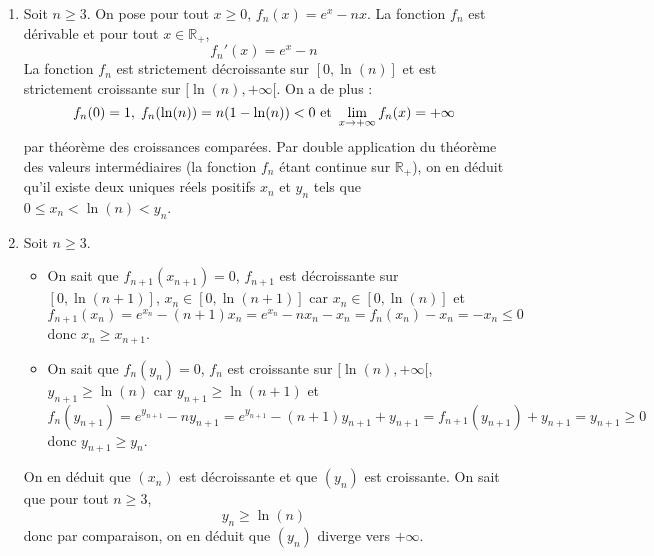 \documentclass[a4paper,10pt]{report}
\begin{document}
\corr \begin{enumerate}
\item Soit $n \geq 3$. On pose pour tout $x \geq 0$, $f_n(x)=e^x-nx$. La fonction $f_n$ est dérivable et pour tout $x \in \mathbb{R}_+$,
$$ f_n'(x)=e^x-n$$
La fonction $f_n$ est strictement décroissante sur $[0, \ln(n)]$ et est strictement croissante sur $[\ln(n), + \infty[$. On a de plus :
$$ f_n(0)=1, \; f_n(\ln(n))=n(1- \ln(n))<0 \hbox{ et } \lim_{x \rightarrow + \infty} f_n(x) = + \infty$$
par théorème des croissances comparées. Par double application du théorème des valeurs intermédiaires (la fonction $f_n$ étant continue sur $\mathbb{R}_+$), on en déduit qu'il existe deux uniques réels positifs $x_n$ et $y_n$ tels que $0 \leq x_n < \ln(n) < y_n$.
\item Soit $n \geq 3$.
\begin{itemize}
\item On sait que $f_{n+1}(x_{n+1})=0$, $f_{n+1}$ est décroissante sur $[0, \ln(n+1)]$, $x_n \in [0, \ln(n+1)]$ car $x_n \in [0, \ln(n)]$ et 
$$ f_{n+1}(x_n) = e^{x_n} - (n+1)x_n = e^{x_n} - nx_n - x_n = f_n(x_n)- x_n = -x_n \leq 0$$
donc $x_n \geq x_{n+1}$.
\item On sait que $f_{n}(y_{n})=0$, $f_{n}$ est croissante sur $[\ln(n), + \infty[$, $y_{n+1} \geq \ln(n)$ car $y_{n+1} \geq \ln(n+1)$ et 
$$ f_{n}(y_{n+1}) = e^{y_{n+1}} - ny_{n+1} = e^{y_{n+1}}-(n+1)y_{n+1} + y_{n+1} = f_{n+1}(y_{n+1})+y_{n+1}= y_{n+1} \geq 0$$
donc $y_{n+1} \geq y_n$.
\end{itemize}
On en déduit que $(x_n)$ est décroissante et que $(y_n)$ est croissante. On sait que pour tout $n \geq 3$,
$$ y_n \geq \ln(n)$$
donc par comparaison, on en déduit que $(y_n)$ diverge vers $+ \infty$. 

\medskip


\end{enumerate}
\end{document}
